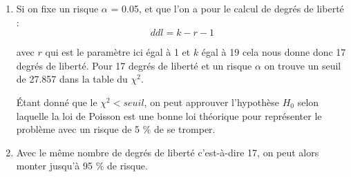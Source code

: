 \documentclass[a4paper,oneside]{article}
\begin{document}
\begin{enumerate}
\item

Si on fixe un risque $\alpha$ = 0.05, et que l'on a pour le calcul de degrés de liberté :
\[
	ddl = k - r - 1
\]

avec $r$ qui est le paramètre ici égal à 1 et $k$ égal à 19
cela nous donne donc 17 degrés de liberté.
Pour 17 degrés de liberté et un risque $\alpha$ on trouve un seuil de 27.857 dans la table du $\chi^2$.


\'Etant donné que le $\chi^2 < seuil$, on peut approuver l'hypothèse $H_0$ selon laquelle la loi de Poisson est une bonne loi théorique pour représenter le problème avec un risque de 5 $\%$ de se tromper.\\

\item

Avec le même nombre de degrés de liberté c'est-à-dire 17, on peut alors monter jusqu'à 95 $\%$ de risque.
\end{enumerate}
\end{document}
